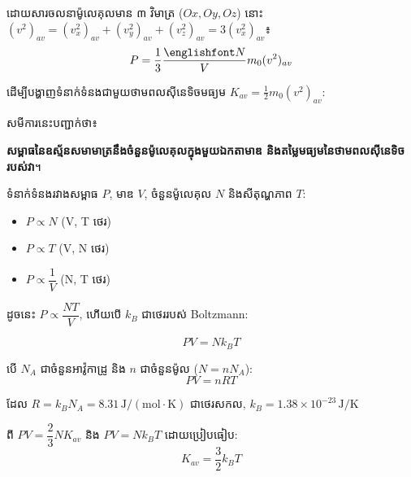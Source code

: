 	\noindent ដោយសារចលនាម៉ូលេគុលមាន ៣ វិមាត្រ ($Ox, Oy, Oz$) នោះ $(v^2)_{av} = (v_x^2)_{av}+(v_y^2)_{av}+(v_z^2)_{av} = 3(v_x^2)_{av}$៖
	\begin{equation}
		P = \frac{1}{3}\frac{{\englishfont N}}{V}m_0(v^2)_{av}
	\end{equation}
	
	\noindent ដើម្បីបង្ហាញទំនាក់ទំនងជាមួយថាមពលស៊ីនេទិចមធ្យម $K_{av} = \frac{1}{2}m_0(v^2)_{av}$:
	
	
	\noindent សមីការនេះបញ្ជាក់ថា៖ \par
	\textbf{សម្ពាធនៃឧស្ម័នសមាមាត្រនឹងចំនួនម៉ូលេគុលក្នុងមួយឯកតាមាឌ និងតម្លៃមធ្យមនៃថាមពលស៊ីនេទិចរបស់វា}។
	
	\vspace{0.4cm}

	
	
	\noindent ទំនាក់ទំនងរវាងសម្ពាធ $P$, មាឌ $V$, ចំនួនម៉ូលេគុល $N$ និងសីតុណ្ហភាព $T$:
	\begin{itemize}[leftmargin=1cm]
		\item $P \propto N$ (V, T ថេរ)
		\item $P \propto T$ (V, N ថេរ)
		\item $P \propto \dfrac{1}{V}$ (N, T ថេរ)
	\end{itemize}
	
	\noindent ដូចនេះ $P \propto \dfrac{NT}{V}$, ហើយបើ $k_B$ ជាថេររបស់ {\englishfont Boltzmann}:
	
	\begin{equation}
		\boxed{PV = Nk_BT}
	\end{equation}
	
	\noindent បើ $N_A$ ជាចំនួនអាវ៉ូកាដ្រូ និង $n$ ជាចំនួនម៉ូល ($N = nN_A$):
	\begin{equation}
		\boxed{PV = nRT}
	\end{equation}
	
	\noindent ដែល $R = k_B N_A = 8.31\,\mathrm{J/(mol\cdot K)}$ ជាថេរសកល, $k_B = 1.38\times10^{-23}\,\mathrm{J/K}$

	
	\noindent ពី $PV = \dfrac{2}{3}NK_{av}$ និង $PV = Nk_BT$ ដោយប្រៀបធៀប:
	\begin{equation}
		\boxed{K_{av} = \frac{3}{2}k_BT}
	\end{equation}
	
